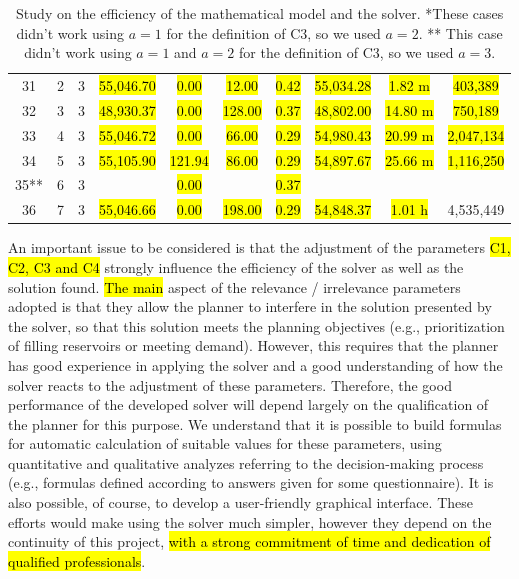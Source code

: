 \documentclass{singlecol}
\theoremstyle{TH}{
\newtheorem{lemma}{Lemma}
\newtheorem{theorem}[lemma]{Theorem}
\newtheorem{corrolary}[lemma]{Corrolary}
\newtheorem{conjecture}[lemma]{Conjecture}
\newtheorem{proposition}[lemma]{Proposition}
\newtheorem{claim}[lemma]{Claim}
\newtheorem{stheorem}[lemma]{Wrong Theorem}
\newtheorem{algorithm}{Algorithm}
}
\theoremstyle{THrm}{
\newtheorem{definition}{Definition}[section]
\newtheorem{question}{Question}[section]
\newtheorem{remark}{Remark}
\newtheorem{scheme}{Scheme}
}
\theoremstyle{THhit}{
\newtheorem{case}{Case}[section]
}
\begin{document}
\begin{table}[h!]
\begin{center}
\begin{small}
\begin{tabular}{ c c c c c c c c c c }
	 31  & 2 & 3  & \hl{55,046.70}  &  \hl{0.00}  & \hl{12.00} &  \hl{0.42}   &   \hl{55,034.28}  & \hl{1.82 m} & \hl{403,389} \\
	 32  & 3 & 3  & \hl{48,930.37}  &  \hl{0.00}  & \hl{128.00} &  \hl{0.37}   &   \hl{48,802.00}  & \hl{14.80 m} & \hl{750,189} \\
	 33  & 4 & 3  & \hl{55,046.72}  &  \hl{0.00}  & \hl{66.00} &  \hl{0.29}   &   \hl{54,980.43}  & \hl{20.99 m} & \hl{2,047,134} \\
	 34  & 5 & 3  & \hl{55,105.90}  &  \hl{121.94}  & \hl{86.00} &  \hl{0.29}   &   \hl{54,897.67}  & \hl{25.66 m} & \hl{1,116,250} \\
	 35**  & 6 & 3  & \hl{}  &  \hl{0.00}  & \hl{} &  \hl{0.37}   &   \hl{}  & \hl{} & \hl{} \\
	 36  & 7 & 3  & \hl{55,046.66}  &  \hl{0.00}  & \hl{198.00} &  \hl{0.29}   &   \hl{54,848.37}  & \hl{1.01 h} & 4,535,449 \\
	\end{tabular}
\caption{Study on the efficiency of the mathematical model and the solver. *These cases didn't work using $a=1$ for the definition of C3, so we used $a=2$. ** This case didn't work using $a=1$ and $a=2$ for the definition of C3, so we used $a=3$.}
\label{tab:lingoEvaluation}
\end{small}
\end{center}
\end{table}

An important issue to be considered is that the adjustment of the parameters \hl{C1, C2, C3 and C4} strongly influence the efficiency of the solver as well as the solution found. \hl{The main} aspect of the relevance / irrelevance parameters adopted is that they allow the planner to interfere in the solution presented by the solver, so that this solution meets the planning objectives (e.g., prioritization of filling reservoirs or meeting demand). However, this requires that the planner has good experience in applying the solver and a good understanding of how the solver reacts to the adjustment of these parameters. Therefore, the good performance of the developed solver will depend largely on the qualification of the planner for this purpose. We understand that it is possible to build formulas for automatic calculation of suitable values for these parameters, using quantitative and qualitative analyzes referring to the decision-making process (e.g., formulas defined according to answers given for some questionnaire). It is also possible, of course, to develop a user-friendly graphical interface. These efforts would make using the solver much simpler, however they depend on the continuity of this project, \hl{with a strong commitment of time and dedication of qualified professionals}.
\end{document}

